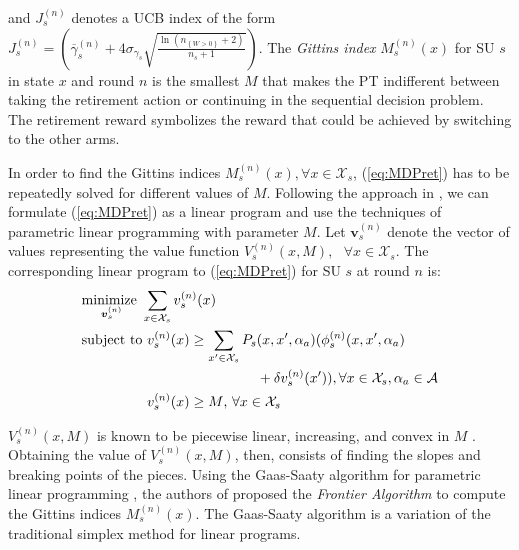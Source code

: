 and $J_s^{(n)}$ denotes a UCB index of the form $J_s^{(n)} = \left(\overline{\gamma}_{s}^{(n)}+4\sigma_{\gamma_s}\sqrt{\frac{\ln{(n_{\left\{W>0\right\}}+2)}}{n_s+1}}\right)$.
The \textit{Gittins index} $M_s^{(n)}(x)$ for SU $s$ in state $x$ and round $n$ is the smallest $M$ that makes the PT indifferent between taking the retirement action or continuing in the sequential decision problem. The retirement reward symbolizes the reward that could be achieved by switching to the other arms.

In order to find the Gittins indices $M_s^{(n)}(x), \forall x \in \mathcal{X}_s$, (\ref{eq:MDPret}) has to be repeatedly solved for different values of $M$. Following the approach in \cite{ref:Brown2013}, we can formulate (\ref{eq:MDPret}) as a linear program \cite{ref:Bertsekas2005} and use the techniques of parametric linear programming with parameter $M$.
Let $\boldsymbol{v}_s^{(n)}$ denote the vector of values representing the value function $V_s^{(n)}(x,M),\text{ }\forall x \in \mathcal{X}_s$. The corresponding linear program to (\ref{eq:MDPret}) for SU $s$ at round $n$ is: 
\begin{equation}
\begin{split}
  &\underset{\boldsymbol{v}_s^{(n)}}{\text{minimize }}\sum_{x \in \mathcal{X}_s} v_s^{(n)}(x)\\
  &\text{subject to }v_s^{(n)}(x) \geq \sum_{x' \in \mathcal{X}_s}  P_s(x,x',\alpha_a)(\phi_s^{(n)}(x,x',\alpha_a)\\
  &\hphantom{\text{subject to }v_s^{(n)}(x) \geq \sum_{x' \in \mathcal{X}_s} P_s}+\delta v_s^{(n)}(x')), \forall x \in \mathcal{X}_s,\alpha_a \in \mathcal{A}\\
  &\hphantom{\text{subject to }}v_s^{(n)}(x)\geq M \text{,    }\forall x \in \mathcal{X}_s
\end{split}
\end{equation}

$V_s^{(n)}(x,M)$ is known to be piecewise linear, increasing, and convex in $M$ \cite{ref:Brown2013}. Obtaining the value of $V_s^{(n)}(x,M)$, then, consists of finding the slopes and breaking points of the pieces. Using the Gaas-Saaty algorithm for parametric linear programming \cite{ref:Gass1955}, the authors of \cite{ref:Brown2013} proposed the \textit{Frontier Algorithm} to compute the Gittins indices $M_s^{(n)}(x)$. The Gaas-Saaty algorithm is a variation of the traditional simplex method for linear programs.

